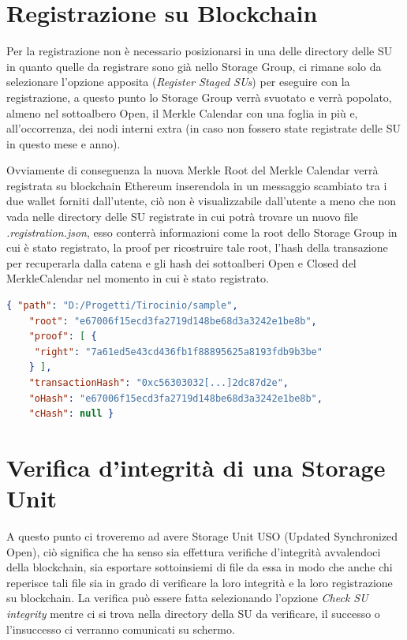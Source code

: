 \section{Registrazione su Blockchain}
\label{sub:regbc}
Per la registrazione non è necessario posizionarsi in una delle directory delle SU
in quanto quelle da registrare sono già nello Storage Group, ci rimane solo
da selezionare l'opzione apposita (\emph{Register Staged SUs}) per eseguire
con la registrazione, a questo punto lo Storage Group verrà svuotato
e verrà popolato, almeno nel sottoalbero Open, il Merkle Calendar con una foglia
in più e, all'occorrenza, dei nodi interni extra (in caso non fossero state
registrate delle SU in questo mese e anno).

Ovviamente di conseguenza la nuova Merkle Root del Merkle Calendar verrà registrata su
blockchain Ethereum inserendola in un messaggio scambiato tra i due wallet forniti dall'utente,
ciò non è visualizzabile dall'utente a meno che non vada nelle directory delle SU registrate 
in cui potrà trovare un nuovo file \emph{.registration.json}, esso conterrà informazioni
come la root dello Storage Group in cui è stato registrato, la proof per ricostruire tale root,
l'hash della transazione per recuperarla dalla catena e gli hash dei sottoalberi Open e Closed
del MerkleCalendar nel momento in cui è stato registrato.
\newpage
\begin{lstlisting}[language=json,firstnumber=1]
    { "path": "D:/Progetti/Tirocinio/sample",
    "root": "e67006f15ecd3fa2719d148be68d3a3242e1be8b",
    "proof": [ {
     "right": "7a61ed5e43cd436fb1f88895625a8193fdb9b3be"
    } ],
    "transactionHash": "0xc56303032[...]2dc87d2e",
    "oHash": "e67006f15ecd3fa2719d148be68d3a3242e1be8b",
    "cHash": null }  
\end{lstlisting}

\section{Verifica d'integrità di una Storage Unit}

A questo punto ci troveremo ad avere Storage Unit USO (Updated Synchronized Open), ciò
significa che ha senso sia effettura verifiche d'integrità avvalendoci della blockchain,
sia esportare sottoinsiemi di file da essa in modo che anche chi reperisce tali file sia
in grado di verificare la loro integrità e la loro registrazione su blockchain.
La verifica può essere fatta selezionando l'opzione \emph{Check SU integrity}
mentre ci si trova nella directory della SU da verificare, il successo o
l'insuccesso ci verranno comunicati su schermo.

